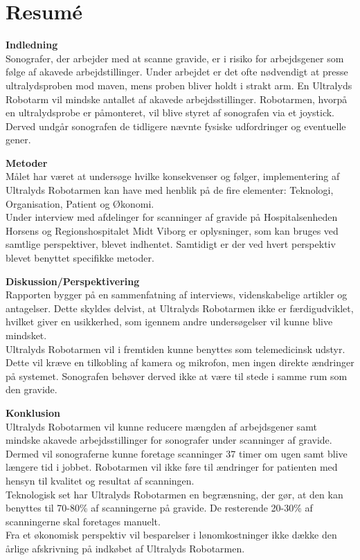 \chapter{Resumé}
\textbf{Indledning} \\ 
Sonografer, der arbejder med at scanne gravide, er i risiko for arbejdsgener som følge af akavede arbejdstillinger. Under arbejdet er det ofte nødvendigt at presse ultralydsproben mod maven, mens proben bliver holdt i strakt arm. En Ultralyds Robotarm vil mindske antallet af akavede arbejdsstillinger. Robotarmen, hvorpå en ultralydsprobe er påmonteret, vil blive styret af sonografen via et joystick. Derved undgår sonografen de tidligere nævnte fysiske udfordringer og eventuelle gener. 

\textbf{Metoder} \\ 
Målet har været at undersøge hvilke konsekvenser og følger, implementering af Ultralyds Robotarmen kan  have med henblik på de fire elementer: Teknologi, Organisation, Patient og Økonomi. \\
Under interview med afdelinger for scanninger af gravide på Hospitalsenheden Horsens og Regionshospitalet Midt Viborg er oplysninger, som kan bruges ved samtlige perspektiver, blevet indhentet. Samtidigt er der ved hvert perspektiv blevet benyttet specifikke metoder. 

\textbf{Diskussion/Perspektivering} \\ 
Rapporten bygger på en sammenfatning af interviews, videnskabelige artikler og antagelser. Dette skyldes delvist, at Ultralyds Robotarmen ikke er færdigudviklet, hvilket giver en usikkerhed, som igennem andre undersøgelser vil kunne blive mindsket. \\
Ultralyds Robotarmen vil  i fremtiden kunne benyttes som telemedicinsk udstyr. Dette vil kræve en tilkobling af kamera og mikrofon, men ingen direkte ændringer på systemet. Sonografen behøver derved ikke at være til stede i samme rum som den gravide.   

\textbf{Konklusion} \\
Ultralyds Robotarmen vil kunne reducere mængden af arbejdsgener samt mindske akavede arbejdsstillinger for sonografer under scanninger af gravide. Dermed vil sonograferne kunne foretage scanninger 37 timer om ugen samt blive længere tid i jobbet. Robotarmen vil ikke føre til ændringer for patienten med hensyn til kvalitet og resultat af scanningen. \\
Teknologisk set har Ultralyds Robotarmen en begrænsning, der gør, at den kan benyttes til 70-80\% af scanningerne på gravide. De resterende 20-30\% af scanningerne skal foretages manuelt.\\
Fra et økonomisk perspektiv vil besparelser i lønomkostninger ikke dække den årlige afskrivning på indkøbet af Ultralyds Robotarmen.